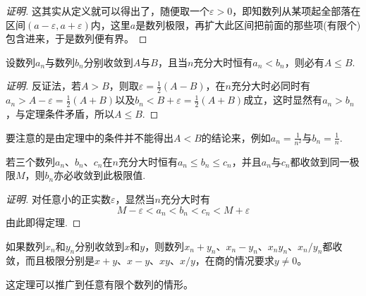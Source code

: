 \begin{proof}[证明]
  这其实从定义就可以得出了，随便取一个$\varepsilon>0$，即知数列从某项起全部落在区间$(a-\varepsilon, a+\varepsilon)$内，这里$a$是数列极限，再扩大此区间把前面的那些项(有限个)包含进来，于是数列便有界。
\end{proof}

\begin{theorem}[保不等式性]
  设数列$a_n$与数列$b_n$分别收敛到$A$与$B$，且当$n$充分大时恒有$a_n<b_n$，则必有$A \leqslant B$.
\end{theorem}

\begin{proof}[证明]
  反证法，若$A>B$，则取$\varepsilon=\frac{1}{2}(A-B)$，在$n$充分大时必同时有$a_n>A-\varepsilon=\frac{1}{2}(A+B)$以及$b_n<B+\varepsilon=\frac{1}{2}(A+B)$成立，这时显然有$a_n>b_n$，与定理条件矛盾，所以$A \leqslant B$.
\end{proof}

要注意的是由定理中的条件并不能得出$A<B$的结论来，例如$a_n=\frac{1}{n^2}$与$b_n=\frac{1}{n}$.

\begin{theorem}
 若三个数列$a_n$、$b_n$、$c_n$在$n$充分大时恒有$a_n \leqslant b_n \leqslant c_n$，并且$a_n$与$c_n$都收敛到同一极限$M$，则$b_n$亦必收敛到此极限值. 
\end{theorem}

\begin{proof}[证明]
  对任意小的正实数$\varepsilon$，显然当$n$充分大时有
  \[ M-\varepsilon < a_n < b_n < c_n < M+\varepsilon \]
  由此即得定理.
\end{proof}

\begin{theorem}
  如果数列$x_n$和$y_n$分别收敛到$x$和$y$，则数列$x_n+y_n$、$x_n-y_n$、$x_ny_n$、$x_n/y_n$都收敛，而且极限分别是$x+y$、$x-y$、$xy$、$x/y$，在商的情况要求$y \neq 0$。
\end{theorem}

这定理可以推广到任意有限个数列的情形。

